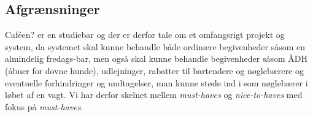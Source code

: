 \documentclass[]{article}
\begin{document}
\subsection{Afgrænsninger}
Caféen? er en studiebar og der er derfor tale om et omfangsrigt projekt og system, da systemet skal kunne behandle både ordinære begivenheder såsom en almindelig fredags-bar, men også skal kunne behandle begivenheder såsom ÅDH (åbner for dovne hunde), udlejninger, rabatter til bartendere og nøglebærere og eventuelle forhindringer og undtagelser, man kunne støde ind i som nøglebærer i løbet af en vagt. Vi har derfor skelnet mellem \textit{must-haves} og \textit{nice-to-haves} med fokus på \textit{must-haves}. \\ \\
%
%
\end{document}
